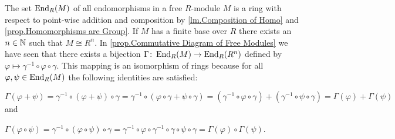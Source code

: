 \begin{rem}
The set $\operatorname{\mathrm{End}}_R(M)$ of all endomorphisms in a free $R$-mod\-ule $M$ is a ring with respect to point-wise addition and composition  by \cref{lm.Composition of Homo} and \cref{prop.Homomorphisms are Group}.
If $M$ has a finite base over $R$ there exists an $n\in\operatorname{\mathbb{N}}$ such that $M\cong R^n$. In \cref{prop.Commutative Diagram of Free Modules} we have seen that there exists a bijection $\Gamma\colon\operatorname{\mathrm{End}}_R(M)\to\operatorname{\mathrm{End}}_R(R^n)$ defined by $\varphi\mapsto\gamma^{-1}\circ\varphi\circ\gamma$.
This mapping is an isomorphism of rings because for all $\varphi,\psi\in\operatorname{\mathrm{End}}_R(M)$ the following identities are satisfied:
\begin{exlist}
\item $\Gamma(\varphi+\psi)=\gamma^{-1}\circ(\varphi+\psi)\circ\gamma =\gamma^{-1}\circ(\varphi\circ\gamma+\psi\circ\gamma)= (\gamma^{-1}\circ\varphi\circ\gamma)+(\gamma^{-1}\circ\psi\circ\gamma)=\Gamma(\varphi)+\Gamma(\psi)$ and
\item $\Gamma(\varphi\circ\psi)=\gamma^{-1}\circ(\varphi\circ\psi)\circ\gamma =\gamma^{-1}\circ\varphi\circ\gamma^{-1}\circ\gamma\circ\psi\circ\gamma =\Gamma(\varphi)\circ\Gamma(\psi)$.
\end{exlist}
\end{rem}

